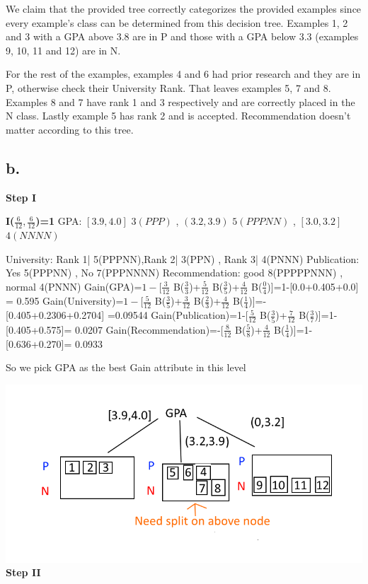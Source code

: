 \documentclass[12pt, letterpaper]{article}
\begin{document}
	We claim that the provided tree correctly categorizes the provided examples since every example's class can be determined from this decision tree. Examples 1, 2 and 3 with a GPA above 3.8 are in P and those with a GPA below 3.3 (examples 9, 10, 11 and 12) are in N. 
	
	For the rest of the examples, examples 4 and 6 had prior research and they are in P, otherwise check their University Rank. That leaves examples 5, 7 and 8. Examples 8 and 7 have rank 1 and 3 respectively and are correctly placed in the N class. Lastly example 5 has rank 2 and is accepted. Recommendation doesn't matter according to this tree.
	
	\subsection{b.}\large
	\textbf{Step I}
	
	\textbf{I($\frac{6}{12},\frac{6}{12}$)=1}\newline
	GPA: $[3.9,4.0]$ $3(PPP)$ , $(3.2,3.9)$ $5(PPPNN)$ , $[3.0,3.2]$ $4(NNNN)$
	
	\noindent University: Rank 1| 5(PPPNN),Rank 2| 3(PPN) , Rank 3| 4(PNNN)\newline
	Publication: Yes 5(PPPNN) , No 7(PPPNNNN)\newline
	Recommendation: good 8(PPPPPNNN) , normal 4(PNNN)\newline\newline
	Gain(GPA)=$1-$[$\frac{3}{12}$ B($\frac{3}{3}$)+$\frac{5}{12}$ B($\frac{3}{5}$)+$\frac{4}{12}$ B($\frac{0}{4}$)]=1-[0.0+0.405+0.0]
	= 0.595\newline\newline
	Gain(University)=$1-$[$\frac{5}{12}$ B($\frac{3}{5}$)+$\frac{3}{12}$ B($\frac{2}{3}$)+$\frac{4}{12}$ B($\frac{1}{4}$)]=-[0.405+0.2306+0.2704] =0.09544\newline\newline
	Gain(Publication)=1-[$\frac{5}{12}$ B($\frac{3}{5}$)+$\frac{7}{12}$ B($\frac{3}{7}$)]=1-[0.405+0.575]= 0.0207\newline\newline
	Gain(Recommendation)=-[$\frac{8}{12}$ B($\frac{5}{8}$)+$\frac{4}{12}$ B($\frac{1}{4}$)]=1-[0.636+0.270]= 0.0933\newline
	
	So we pick GPA as the best Gain attribute in this level
	
	\includegraphics[scale=0.8]{"problem-2-step1"}
	\textbf{Step II}
	
\end{document}
